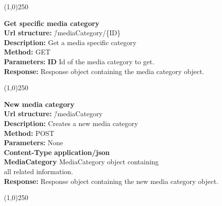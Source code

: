 \documentclass[11pt]{article}
\begin{document}
\begin{center}\line(1,0){250}\end{center}

\begin{tabbing}
\textbf{Get specific media category} \\
\textcolor{black!60}{\textbf{Url structure:}} \hspace{0.2in} \= /mediaCategory/\{ID\} \\
\textcolor{black!60}{\textbf{Description:}}  \> Get a media specific category \\
\textcolor{black!60}{\textbf{Method:}} \> GET \\
\textcolor{black!60}{\textbf{Parameters:}} \> \textbf{ID} Id of the media category to get. \\
\textcolor{black!60}{\textbf{Response:}} \> Response object containing the media category object.
\end{tabbing}

\begin{center}\line(1,0){250}\end{center}

\begin{tabbing}
\textbf{New media category} \\
\textcolor{black!60}{\textbf{Url structure:}} \hspace{0.2in} \= /mediaCategory \\
\textcolor{black!60}{\textbf{Description:}}  \> Creates a new media category \\
\textcolor{black!60}{\textbf{Method:}} \> POST \\
\textcolor{black!60}{\textbf{Parameters:}} \> None \\
\textcolor{black!60}{\textbf{Content-Type}} \> \textbf{application/json} \\
\> \textbf{MediaCategory} MediaCategory object containing 
\\ \> all related information. \\
\textcolor{black!60}{\textbf{Response:}} \> Response object containing the new media category object.
\end{tabbing}

\begin{center}\line(1,0){250}\end{center}
\end{document}
